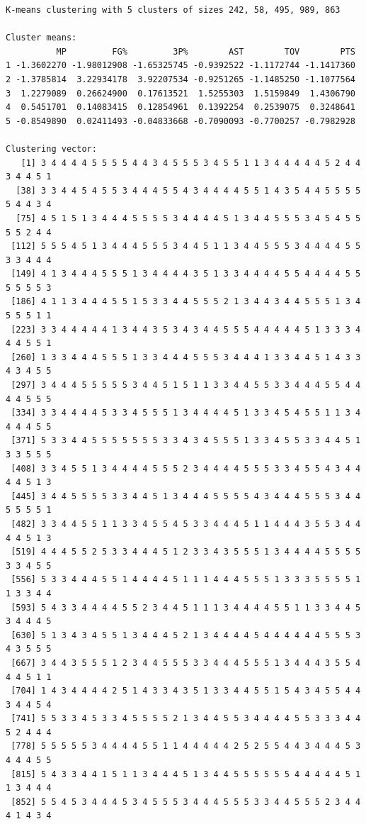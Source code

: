 \documentclass[
  letterpaper,
  DIV=11,
  numbers=noendperiod]{scrreprt}
\begin{document}
\begin{verbatim}
K-means clustering with 5 clusters of sizes 242, 58, 495, 989, 863

Cluster means:
          MP         FG%         3P%        AST        TOV        PTS
1 -1.3602270 -1.98012908 -1.65325745 -0.9392522 -1.1172744 -1.1417360
2 -1.3785814  3.22934178  3.92207534 -0.9251265 -1.1485250 -1.1077564
3  1.2279089  0.26624900  0.17613521  1.5255303  1.5159849  1.4306790
4  0.5451701  0.14083415  0.12854961  0.1392254  0.2539075  0.3248641
5 -0.8549890  0.02411493 -0.04833668 -0.7090093 -0.7700257 -0.7982928

Clustering vector:
   [1] 3 4 4 4 4 5 5 5 5 4 4 3 4 5 5 5 3 4 5 5 1 1 3 4 4 4 4 4 5 2 4 4 3 4 4 5 1
  [38] 3 3 4 4 5 4 5 5 3 4 4 4 5 5 4 3 4 4 4 4 5 5 1 4 3 5 4 4 5 5 5 5 5 4 4 3 4
  [75] 4 5 1 5 1 3 4 4 4 5 5 5 5 3 4 4 4 4 5 1 3 4 4 5 5 5 3 4 5 4 5 5 5 5 2 4 4
 [112] 5 5 5 4 5 1 3 4 4 4 5 5 5 3 4 4 5 1 1 3 4 4 5 5 5 3 4 4 4 4 5 5 3 3 4 4 4
 [149] 4 1 3 4 4 4 5 5 5 1 3 4 4 4 4 3 5 1 3 3 4 4 4 4 5 5 4 4 4 4 5 5 5 5 5 5 3
 [186] 4 1 1 3 4 4 4 5 5 1 5 3 3 4 4 5 5 5 2 1 3 4 4 3 4 4 5 5 5 1 3 4 5 5 5 1 1
 [223] 3 3 4 4 4 4 4 1 3 4 4 3 5 3 4 3 4 4 5 5 5 4 4 4 4 4 5 1 3 3 3 4 4 4 5 5 1
 [260] 1 3 3 4 4 4 5 5 5 1 3 3 4 4 4 5 5 5 3 4 4 4 1 3 3 4 4 5 1 4 3 3 4 3 4 5 5
 [297] 3 4 4 4 5 5 5 5 5 3 4 4 5 1 5 1 1 3 3 4 4 5 5 3 3 4 4 4 5 5 4 4 4 4 5 5 5
 [334] 3 3 4 4 4 4 5 3 3 4 5 5 5 1 3 4 4 4 4 5 1 3 3 4 5 4 5 5 1 1 3 4 4 4 4 5 5
 [371] 5 3 3 4 4 5 5 5 5 5 5 5 3 3 4 3 4 5 5 5 1 3 3 4 5 5 3 3 4 4 5 1 3 3 5 5 5
 [408] 3 3 4 5 5 1 3 4 4 4 4 5 5 5 2 3 4 4 4 4 5 5 5 3 3 4 5 5 4 3 4 4 4 4 5 1 3
 [445] 3 4 4 5 5 5 5 3 3 4 4 5 1 3 4 4 4 5 5 5 5 4 3 4 4 4 5 5 5 3 4 4 5 5 5 5 1
 [482] 3 3 4 4 5 5 1 1 3 3 4 5 5 4 5 3 3 4 4 4 5 1 1 4 4 4 3 5 5 3 4 4 4 4 5 1 3
 [519] 4 4 4 5 5 2 5 3 3 4 4 4 5 1 2 3 3 4 3 5 5 5 1 3 4 4 4 4 5 5 5 5 3 3 4 5 5
 [556] 5 3 3 4 4 4 5 5 1 4 4 4 4 5 1 1 1 4 4 4 5 5 5 1 3 3 3 5 5 5 5 1 1 3 3 4 4
 [593] 5 4 3 3 4 4 4 4 5 5 2 3 4 4 5 1 1 1 3 4 4 4 4 5 5 1 1 3 3 4 4 5 3 4 4 4 5
 [630] 5 1 3 4 3 4 5 5 1 3 4 4 4 5 2 1 3 4 4 4 4 5 4 4 4 4 4 4 5 5 5 3 4 3 5 5 5
 [667] 3 4 4 3 5 5 5 1 2 3 4 4 5 5 5 3 3 4 4 4 5 5 5 1 3 4 4 4 3 5 5 4 4 4 5 1 1
 [704] 1 4 3 4 4 4 4 2 5 1 4 3 3 4 3 5 1 3 3 4 4 5 5 1 5 4 3 4 5 5 4 4 3 4 4 5 4
 [741] 5 5 3 3 4 5 3 3 4 5 5 5 5 2 1 3 4 4 5 5 3 4 4 4 4 5 5 3 3 3 4 4 5 2 4 4 4
 [778] 5 5 5 5 5 3 4 4 4 4 5 5 1 1 4 4 4 4 4 2 5 2 5 5 4 4 3 4 4 4 5 3 4 4 4 5 5
 [815] 5 4 3 3 4 4 1 5 1 1 3 4 4 4 5 1 3 4 4 5 5 5 5 5 5 4 4 4 4 4 5 1 1 3 4 4 4
 [852] 5 5 4 5 3 4 4 4 5 3 4 5 5 5 3 4 4 4 5 5 5 3 3 4 4 5 5 5 2 3 4 4 4 1 4 3 4

\end{verbatim}
\end{document}
